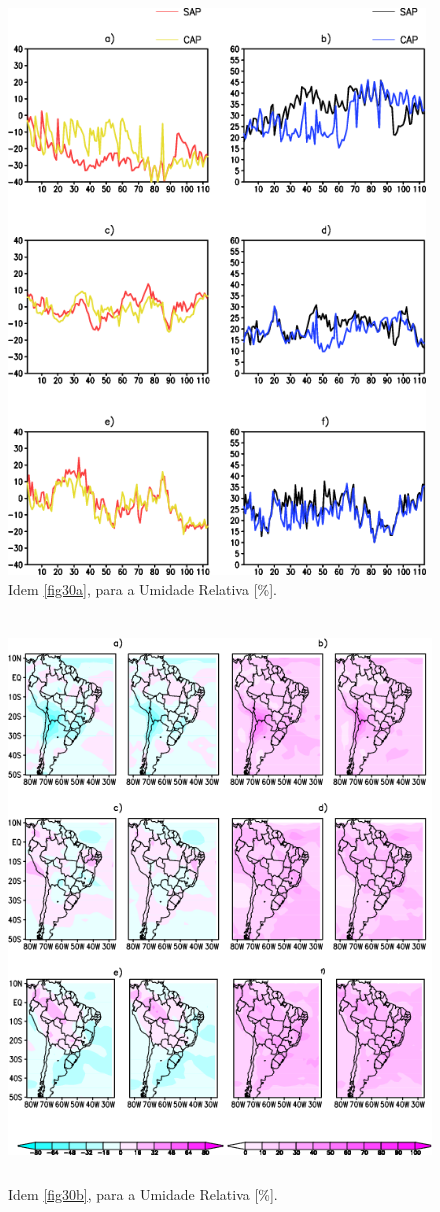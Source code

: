 \begin{figure}[!hbp]
\centering
\includegraphics[height=15cm]{./figs/vies_eqm-umrl.png}
\caption{Idem \autoref{fig30a}, para a Umidade Relativa [\%].}
\label{fig34a}
\end{figure}

\begin{figure}[!hbp]
\centering
\includegraphics[height=15cm]{./figs/campo_vies_eqm-umrl.png}
\caption{Idem \autoref{fig30b}, para a Umidade Relativa [\%].}
\label{fig34b}
\end{figure}

